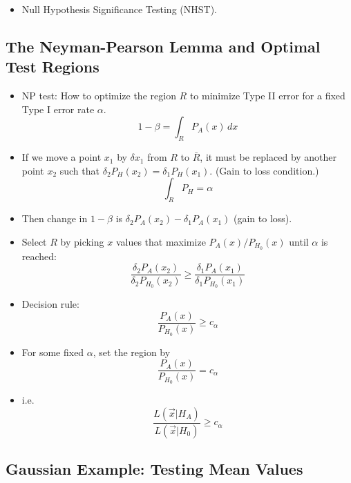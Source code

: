 \begin{itemize}
    \item Null Hypothesis Significance Testing (NHST).
\end{itemize}

\subsection{The Neyman-Pearson Lemma and Optimal Test Regions}

\begin{itemize}
    \item NP test: How to optimize the region $R$ to minimize Type II error for a fixed Type I error rate $\alpha$.
          \[ 1- \beta = \int_{R} P_{A}(x) \, dx \]
    \item If we move a point $x_1$ by $\delta x_1$ from $R$ to $\bar{R}$, it must be replaced by another point $x_2$ such that $\delta_{2}P_{H}(x_2) = \delta_{1} P_{H}(x_1)$. (Gain to loss condition.)
          \[ \int_{R} P_{H} = \alpha \]
    \item Then change in $1-\beta$ is $\delta_{2} P_{A} (x_2) - \delta_{1} P_{A} (x_1)$ (gain to loss).
    \item Select $R$ by picking $x$ values that maximize $P_{A}(x)/P_{H_{0}}(x)$ until $\alpha$ is reached:
          \[ \frac{\delta_{2} P_{A}(x_2)}{ \delta_{2} P_{H_{0}}(x_2)} \geq \frac{\delta_{1} P_A(x_1)}{\delta_{1} P_{H_{0}}(x_1)} \]
    \item Decision rule:
          \[ \frac{P_{A}(x)}{P_{H_{0}}(x)} \geq c_{\alpha} \]
    \item For some fixed $\alpha$, set the region by
          \[ \frac{P_{A}(x)}{P_{H_{0}}(x)} = c_{\alpha} \]
    \item i.e.
          \[ \frac{L(\vec{x}|H_{A})}{L(\vec{x}|H_{0})} \geq c_{\alpha} \]
\end{itemize}

\subsection{Gaussian Example: Testing Mean Values}

